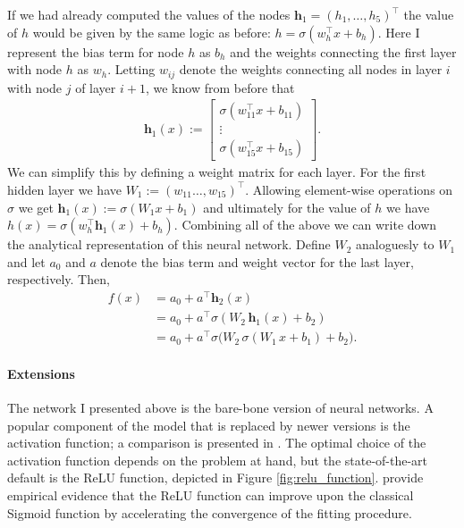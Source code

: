 If we had already computed the values of the nodes $\mathbf{h}_1 = (h_1, \dots,
h_5)^\top$ the value of $h$ would be given by the same logic as before: $h =
\sigma(w_h^\top x + b_h)$. Here I represent the bias term for node $h$ as $b_h$ and the
weights connecting the first layer with node $h$ as $w_h$. Letting $w_{ij}$ denote the
weights connecting all nodes in layer $i$ with node $j$ of layer $i+1$, we know from
before that
\begin{align*}
    \mathbf{h}_1(x) :=
        \begin{bmatrix}
            \sigma(w_{11}^\top x + b_{11})\\
            \vdots\\
            \sigma(w_{15}^\top x + b_{15})
        \end{bmatrix}.
\end{align*}
We can simplify this by defining a weight matrix for each layer. For the first hidden
layer we have $W_1 := (w_{11} \dots, w_{15})^\top$. Allowing element-wise operations on
$\sigma$ we get $\mathbf{h}_1(x) := \sigma(W_1 x + b_1)$ and ultimately for the value of $h$
we have $h(x) = \sigma(w_h^\top \mathbf{h}_1(x) + b_h)$. Combining all of the above we
can write down the analytical representation of this neural network. Define $W_2$
analoguesly to $W_1$ and let $a_0$ and $a$ denote the bias term and weight vector for
the last layer, respectively. Then,
\begin{align*}
    f(x) &= a_0 + a^\top \mathbf{h}_2(x)\\
         &= a_0 + a^\top \sigma(W_2 \, \mathbf{h}_1(x) + b_2)\\
         &= a_0 + a^\top \sigma \big( W_2 \, \sigma(W_1 \, x + b_1) + b_2 \big).
\end{align*}


\paragraph{Extensions}

The network I presented above is the bare-bone version of neural networks. A popular
component of the model that is replaced by newer versions is the activation function;
a comparison is presented in \cite{Hara.1994}. The optimal choice of the activation
function depends on the problem at hand, but the state-of-the-art default is the
ReLU function, depicted in Figure \ref{fig:relu_function}. \cite{Hinton.2017} provide
empirical evidence that the ReLU function can improve upon the classical Sigmoid
function by accelerating the convergence of the fitting procedure.

